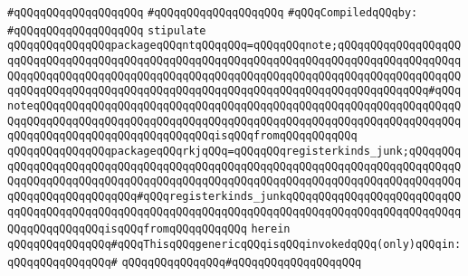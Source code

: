 \verb|#qQQqqQQqqQQqqQQqqQQq|\newline
\verb|#qQQqqQQqqQQqqQQqqQQq|\newline
\newline
\verb|#qQQqCompiledqQQqby:|\newline
\verb|#qQQqqQQqqQQqqQQqqQQq|\newline
\newline
\newline
\newline
\verb|stipulate|\newline
\verb|qQQqqQQqqQQqqQQqpackageqQQqntqQQqqQQq=qQQqqQQqnote;qQQqqQQqqQQqqQQqqQQqqQQqqQQqqQQqqQQqqQQqqQQqqQQqqQQqqQQqqQQqqQQqqQQqqQQqqQQqqQQqqQQqqQQqqQQqqQQqqQQqqQQqqQQqqQQqqQQqqQQqqQQqqQQqqQQqqQQqqQQqqQQqqQQqqQQqqQQqqQQqqQQqqQQqqQQqqQQqqQQqqQQqqQQqqQQqqQQqqQQqqQQqqQQqqQQqqQQqqQQqqQQq#qQQqnoteqQQqqQQqqQQqqQQqqQQqqQQqqQQqqQQqqQQqqQQqqQQqqQQqqQQqqQQqqQQqqQQqqQQqqQQqqQQqqQQqqQQqqQQqqQQqqQQqqQQqqQQqqQQqqQQqqQQqqQQqqQQqqQQqqQQqqQQqqQQqqQQqqQQqqQQqqQQqqQQqqQQqqQQqisqQQqfromqQQqqQQqqQQq|\newline
\verb|qQQqqQQqqQQqqQQqpackageqQQqrkjqQQq=qQQqqQQqregisterkinds_junk;qQQqqQQqqQQqqQQqqQQqqQQqqQQqqQQqqQQqqQQqqQQqqQQqqQQqqQQqqQQqqQQqqQQqqQQqqQQqqQQqqQQqqQQqqQQqqQQqqQQqqQQqqQQqqQQqqQQqqQQqqQQqqQQqqQQqqQQqqQQqqQQqqQQqqQQqqQQqqQQqqQQqqQQq#qQQqregisterkinds_junkqQQqqQQqqQQqqQQqqQQqqQQqqQQqqQQqqQQqqQQqqQQqqQQqqQQqqQQqqQQqqQQqqQQqqQQqqQQqqQQqqQQqqQQqqQQqqQQqqQQqqQQqqQQqqQQqisqQQqfromqQQqqQQqqQQq|\newline
\verb|herein|\newline
\newline
\verb|qQQqqQQqqQQqqQQq#qQQqThisqQQqgenericqQQqisqQQqinvokedqQQq(only)qQQqin:|\newline
\verb|qQQqqQQqqQQqqQQq#|\newline
\verb|qQQqqQQqqQQqqQQq#qQQqqQQqqQQqqQQqqQQq|\newline
